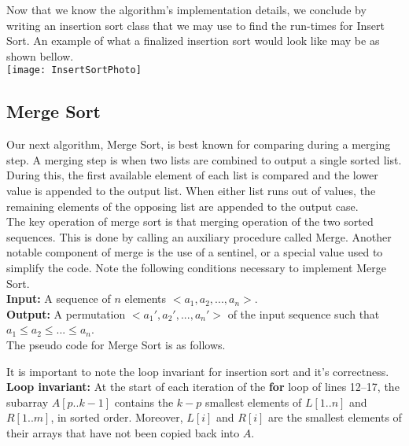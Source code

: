 \documentclass[12pt]{article}
\begin{document}
Now that we know the algorithm's implementation details, we conclude by writing an insertion sort class that we may use to find the run-times for Insert Sort. An example of what a finalized insertion sort would look like may be as shown bellow.\\

\texttt{[image: InsertSortPhoto]}


\subsection*{Merge Sort}
Our next algorithm, Merge Sort, is best known for comparing during a merging step. A merging step is when two lists are combined to output a single sorted list. During this, the first available element of each list is compared and the lower value is appended to the output list. When either list runs out of values, the remaining elements of the opposing list are appended to the output case. \\

The key operation of merge sort is that merging operation of the two sorted sequences. This is done by calling an auxiliary procedure called Merge. Another notable component of merge is the use of a sentinel, or a special value used to simplify the code.  Note the following conditions necessary to implement Merge Sort.\\

\textbf{Input:} A sequence of $n$ elements $<a_1, a_2, ..., a_n>$.\\

\textbf{Output:} A permutation $<a_1', a_2', ..., a_n'>$ of the input sequence such that \\
\indent $a_1 \le a_2 \le ... \le a_n$.\\
The pseudo code for Merge Sort is as follows.



It is important to note the loop invariant for insertion sort and it's correctness. \\

\textbf{Loop invariant:} At the start of each iteration of the \textbf{for }loop of lines 12–17, the subarray $A[p..k-1]$ contains the $k - p$ smallest elements of $L[1..n]$ and $R[1..m]$, in sorted order. Moreover, $L[i]$ and $R[i]$ are the smallest elements of their arrays that have not been copied back into $A$.  \\
\end{document}

